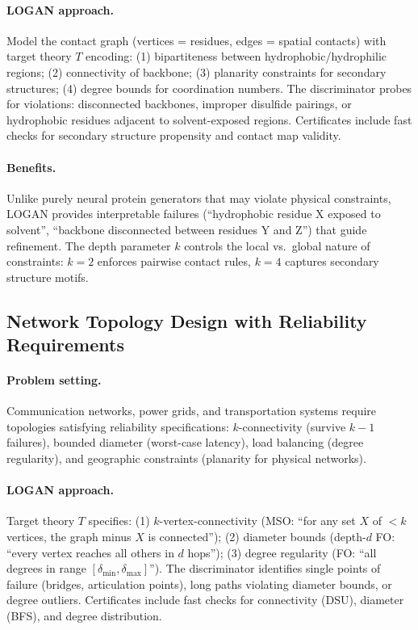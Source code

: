 \documentclass{article}
\begin{document}
\paragraph{LOGAN approach.}
Model the contact graph (vertices = residues, edges = spatial contacts) with target theory $T$ encoding: (1) bipartiteness between hydrophobic/hydrophilic regions; (2) connectivity of backbone; (3) planarity constraints for secondary structures; (4) degree bounds for coordination numbers. The discriminator probes for violations: disconnected backbones, improper disulfide pairings, or hydrophobic residues adjacent to solvent-exposed regions. Certificates include fast checks for secondary structure propensity and contact map validity.

\paragraph{Benefits.}
Unlike purely neural protein generators that may violate physical constraints, LOGAN provides interpretable failures (``hydrophobic residue X exposed to solvent'', ``backbone disconnected between residues Y and Z'') that guide refinement. The depth parameter $k$ controls the local vs.\ global nature of constraints: $k=2$ enforces pairwise contact rules, $k=4$ captures secondary structure motifs.

\subsection{Network Topology Design with Reliability Requirements}

\paragraph{Problem setting.}
Communication networks, power grids, and transportation systems require topologies satisfying reliability specifications: $k$-connectivity (survive $k-1$ failures), bounded diameter (worst-case latency), load balancing (degree regularity), and geographic constraints (planarity for physical networks).

\paragraph{LOGAN approach.}
Target theory $T$ specifies: (1) $k$-vertex-connectivity (MSO: ``for any set $X$ of $<k$ vertices, the graph minus $X$ is connected''); (2) diameter bounds (depth-$d$ FO: ``every vertex reaches all others in $d$ hops''); (3) degree regularity (FO: ``all degrees in range $[\delta_{\min}, \delta_{\max}]$''). The discriminator identifies single points of failure (bridges, articulation points), long paths violating diameter bounds, or degree outliers. Certificates include fast checks for connectivity (DSU), diameter (BFS), and degree distribution.
\end{document}
